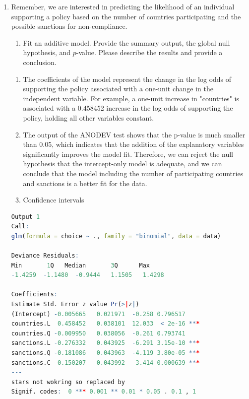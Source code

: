 \documentclass[12pt,letterpaper]{article}
\begin{document}
\begin{enumerate}
	\item
	Remember, we are interested in predicting the likelihood of an individual supporting a policy based on the number of countries participating and the possible sanctions for non-compliance.
	\begin{enumerate}
		\item [] Fit an additive model. Provide the summary output, the global null hypothesis, and $p$-value. Please describe the results and provide a conclusion.
	\end{enumerate}
  
	\begin{enumerate}
		\item [Output 1] The coefficients of the model represent the change in the log odds of supporting the policy associated with a one-unit change in the independent variable. For example, a one-unit increase in "countries" is associated with a 0.458452 increase in the log odds of supporting the policy, holding all other variables constant.
		\item[Output 2] The output of the ANODEV test shows that the p-value is much smaller than 0.05, which indicates that the addition of the explanatory variables significantly improves the model fit. Therefore, we can reject the null hypothesis that the intercept-only model is adequate, and we can conclude that the model including the number of participating countries and sanctions is a better fit for the data.
		\item[Output 3] Confidence intervals
	\end{enumerate}
\begin{lstlisting}[language=R]
Output 1
Call:
glm(formula = choice ~ ., family = "binomial", data = data)

Deviance Residuals: 
Min       1Q   Median       3Q      Max  
-1.4259  -1.1480  -0.9444   1.1505   1.4298  

Coefficients:
Estimate Std. Error z value Pr(>|z|)    
(Intercept) -0.005665   0.021971  -0.258 0.796517    
countries.L  0.458452   0.038101  12.033  < 2e-16 ***
countries.Q -0.009950   0.038056  -0.261 0.793741    
sanctions.L -0.276332   0.043925  -6.291 3.15e-10 ***
sanctions.Q -0.181086   0.043963  -4.119 3.80e-05 ***
sanctions.C  0.150207   0.043992   3.414 0.000639 ***
---
stars not wokring so replaced by
Signif. codes:  0 *** 0.001 ** 0.01 * 0.05 . 0.1 , 1


\end{lstlisting}
\end{enumerate}
\end{document}
